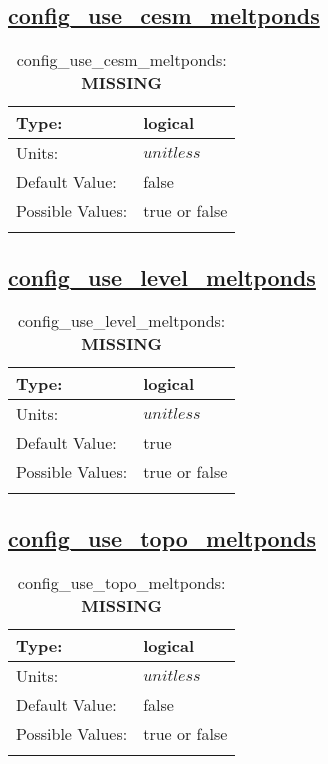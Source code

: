 \subsection[config\_use\_cesm\_meltponds]{\hyperref[sec:nm_tab_column_tracers]{config\_use\_cesm\_meltponds}}
\label{subsec:nm_sec_config_use_cesm_meltponds}
\begin{center}
\begin{longtable}{| p{2.0in} || p{4.0in} |}
    \hline
    Type: & logical \\
    \hline
    Units: & $unitless$ \\
    \hline
    Default Value: & false \\
    \hline
    Possible Values: & true or false \\
    \hline
    \caption{config\_use\_cesm\_meltponds: {\bf \color{red} MISSING}}
\end{longtable}
\end{center}
\subsection[config\_use\_level\_meltponds]{\hyperref[sec:nm_tab_column_tracers]{config\_use\_level\_meltponds}}
\label{subsec:nm_sec_config_use_level_meltponds}
\begin{center}
\begin{longtable}{| p{2.0in} || p{4.0in} |}
    \hline
    Type: & logical \\
    \hline
    Units: & $unitless$ \\
    \hline
    Default Value: & true \\
    \hline
    Possible Values: & true or false \\
    \hline
    \caption{config\_use\_level\_meltponds: {\bf \color{red} MISSING}}
\end{longtable}
\end{center}
\subsection[config\_use\_topo\_meltponds]{\hyperref[sec:nm_tab_column_tracers]{config\_use\_topo\_meltponds}}
\label{subsec:nm_sec_config_use_topo_meltponds}
\begin{center}
\begin{longtable}{| p{2.0in} || p{4.0in} |}
    \hline
    Type: & logical \\
    \hline
    Units: & $unitless$ \\
    \hline
    Default Value: & false \\
    \hline
    Possible Values: & true or false \\
    \hline
    \caption{config\_use\_topo\_meltponds: {\bf \color{red} MISSING}}
\end{longtable}
\end{center}

